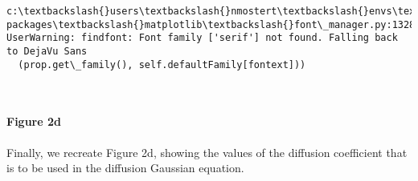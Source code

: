 \documentclass[11pt]{article}
\begin{document}
    \begin{Verbatim}[commandchars=\\\{\}]
c:\textbackslash{}users\textbackslash{}nmostert\textbackslash{}envs\textbackslash{}spew\textbackslash{}lib\textbackslash{}site-packages\textbackslash{}matplotlib\textbackslash{}font\_manager.py:1328: UserWarning: findfont: Font family ['serif'] not found. Falling back to DejaVu Sans
  (prop.get\_family(), self.defaultFamily[fontext]))

    \end{Verbatim}

    \begin{center}
    \end{center}
    { \hspace*{\fill} \\}
    
    \paragraph{Figure 2d}\label{figure-2d}

Finally, we recreate Figure 2d, showing the values of the diffusion
coefficient that is to be used in the diffusion Gaussian equation.
\end{document}
